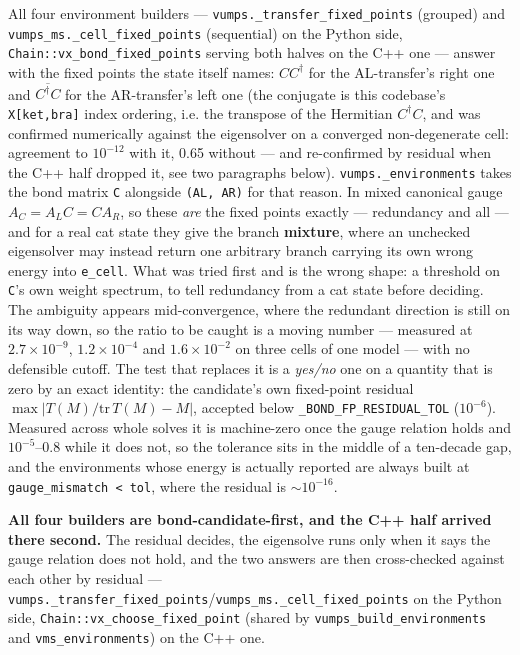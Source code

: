 \documentclass[11pt]{article}
\begin{document}
All four environment builders ---
\texttt{vumps.\_transfer\_fixed\_points} (grouped) and
\texttt{vumps\_ms.\_cell\_fixed\_points} (sequential) on the Python side,
\texttt{Chain::vx\_bond\_fixed\_points} serving both halves on the C++
one --- answer with the fixed points the state itself names:
$CC^\dagger$ for
the AL-transfer's right one and $\overline{C^\dagger C}$ for the
AR-transfer's left one (the conjugate is this codebase's
\texttt{X[ket,bra]} index ordering, i.e. the transpose of the Hermitian
$C^\dagger C$, and was confirmed numerically against the eigensolver on a
converged non-degenerate cell: agreement to $10^{-12}$ with it, 0.65
without --- and re-confirmed by residual when the C++ half dropped it,
see two paragraphs below).
\texttt{vumps.\_environments} takes the bond matrix \texttt{C}
alongside \texttt{(AL, AR)} for that reason. In mixed canonical gauge
$A_C = A_L C = C A_R$, so these \emph{are} the fixed points exactly ---
redundancy and all --- and for a real cat state they give the branch
\textbf{mixture}, where an unchecked eigensolver may instead return one
arbitrary branch carrying its own wrong energy into \texttt{e\_cell}.
What was tried first and is the wrong shape: a threshold on \texttt{C}'s
own weight spectrum, to tell redundancy from a cat state before deciding.
The ambiguity appears mid-convergence, where the redundant direction is
still on its way down, so the ratio to be caught is a moving number ---
measured at $2.7\times10^{-9}$, $1.2\times10^{-4}$ and
$1.6\times10^{-2}$ on three cells of one model --- with no defensible
cutoff. The test that replaces it is a \emph{yes/no} one on a quantity
that is zero by an exact identity: the candidate's own fixed-point
residual $\max|T(M)/\mathrm{tr}\,T(M) - M|$, accepted below
\texttt{\_BOND\_FP\_RESIDUAL\_TOL} ($10^{-6}$). Measured across whole
solves it is machine-zero once the gauge relation holds and
$10^{-5}$--0.8 while it does not, so the tolerance sits in the middle of
a ten-decade gap, and the environments whose energy is actually reported
are always built at \texttt{gauge\_mismatch < tol}, where the residual is
$\sim10^{-16}$.

\textbf{All four builders are bond-candidate-first, and the C++ half
arrived there second.} The residual decides, the eigensolve runs only
when it says the gauge relation does not hold, and the two answers are
then cross-checked against each other by residual ---
\texttt{vumps.\_transfer\_fixed\_points}/\texttt{vumps\_ms.\_cell\_fixed\_points}
on the Python side, \texttt{Chain::vx\_choose\_fixed\_point} (shared by
\texttt{vumps\_build\_environments} and \texttt{vms\_environments}) on
the C++ one.
\end{document}
